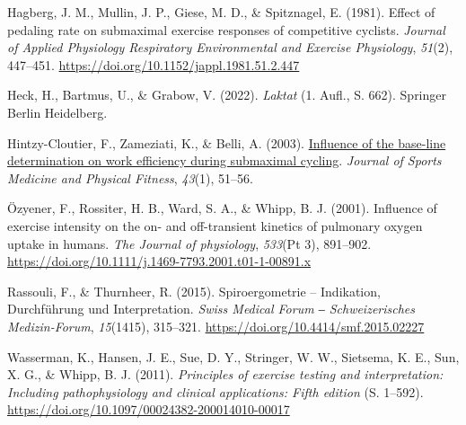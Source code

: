 \documentclass[
  letterpaper,
  DIV=11]{scrartcl}
\newlength{\cslhangindent}
\newenvironment{CSLReferences}[2] %
 {\begin{list}{}{%
  \setlength{\itemindent}{0pt}
  \setlength{\leftmargin}{0pt}
  \setlength{\parsep}{0pt}
  \ifodd #1
   \setlength{\leftmargin}{\cslhangindent}
   \setlength{\itemindent}{-1\cslhangindent}
  \fi
  \setlength{\itemsep}{#2\baselineskip}}}
 {\end{list}}
\begin{document}
\label{refs}
\begin{CSLReferences}{1}{0}
Hagberg, J. M., Mullin, J. P., Giese, M. D., \& Spitznagel, E. (1981).
{Effect of pedaling rate on submaximal exercise responses of competitive
cyclists}. \emph{Journal of Applied Physiology Respiratory Environmental
and Exercise Physiology}, \emph{51}(2), 447--451.
\url{https://doi.org/10.1152/jappl.1981.51.2.447}

Heck, H., Bartmus, U., \& Grabow, V. (2022). \emph{{Laktat}} (1. Aufl.,
S. 662). Springer Berlin Heidelberg.

Hintzy-Cloutier, F., Zameziati, K., \& Belli, A. (2003).
\href{https://www.ncbi.nlm.nih.gov/pubmed/12629462}{{Influence of the
base-line determination on work efficiency during submaximal cycling}}.
\emph{Journal of Sports Medicine and Physical Fitness}, \emph{43}(1),
51--56.

Özyener, F., Rossiter, H. B., Ward, S. A., \& Whipp, B. J. (2001).
{Influence of exercise intensity on the on- and off-transient kinetics
of pulmonary oxygen uptake in humans.} \emph{The Journal of physiology},
\emph{533}(Pt 3), 891--902.
\url{https://doi.org/10.1111/j.1469-7793.2001.t01-1-00891.x}

Rassouli, F., \& Thurnheer, R. (2015). {Spiroergometrie -- Indikation,
Durchf{ü}hrung und Interpretation}. \emph{Swiss Medical Forum ‒
Schweizerisches Medizin-Forum}, \emph{15}(1415), 315--321.
\url{https://doi.org/10.4414/smf.2015.02227}

Wasserman, K., Hansen, J. E., Sue, D. Y., Stringer, W. W., Sietsema, K.
E., Sun, X. G., \& Whipp, B. J. (2011). \emph{{Principles of exercise
testing and interpretation: Including pathophysiology and clinical
applications: Fifth edition}} (S. 1--592).
\url{https://doi.org/10.1097/00024382-200014010-00017}

\end{CSLReferences}
\end{document}
